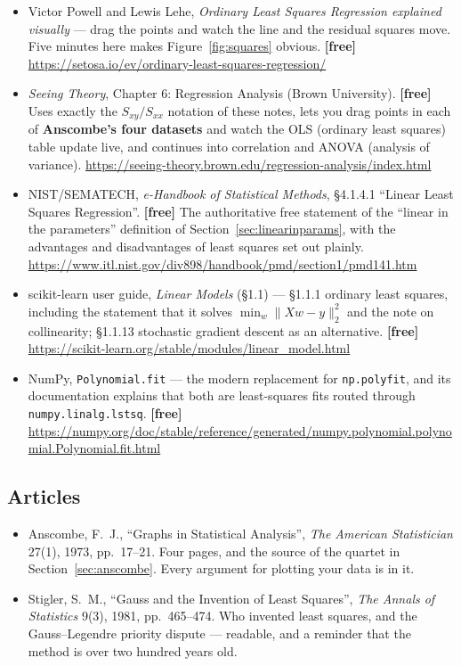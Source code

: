 \documentclass[11pt]{article}
\begin{document}
\begin{itemize}[leftmargin=*]
  \item Victor Powell and Lewis Lehe, \emph{Ordinary Least Squares Regression
    explained visually} --- drag the points and watch the line and the
    residual squares move. Five minutes here makes Figure~\ref{fig:squares}
    obvious. \textbf{[free]}
    \url{https://setosa.io/ev/ordinary-least-squares-regression/}
  \item \emph{Seeing Theory}, Chapter 6: Regression Analysis (Brown
    University). \textbf{[free]} Uses exactly the $S_{xy}/S_{xx}$ notation of
    these notes, lets you drag points in each of \textbf{Anscombe's four
    datasets} and watch the OLS (ordinary least squares) table update live, and continues into
    correlation and ANOVA (analysis of variance).
    \url{https://seeing-theory.brown.edu/regression-analysis/index.html}
  \item NIST/SEMATECH, \emph{e-Handbook of Statistical Methods}, \S4.1.4.1
    ``Linear Least Squares Regression''. \textbf{[free]} The authoritative
    free statement of the ``linear in the parameters'' definition of
    Section~\ref{sec:linearinparams}, with the advantages and disadvantages of
    least squares set out plainly.
    \url{https://www.itl.nist.gov/div898/handbook/pmd/section1/pmd141.htm}
  \item scikit-learn user guide, \emph{Linear Models} (\S1.1) ---
    \S1.1.1 ordinary least squares, including the statement that it solves
    $\min_w \lVert Xw-y\rVert_2^2$ and the note on collinearity;
    \S1.1.13 stochastic gradient descent as an alternative. \textbf{[free]}
    \url{https://scikit-learn.org/stable/modules/linear_model.html}
  \item NumPy, \texttt{Polynomial.fit} --- the modern replacement for
    \texttt{np.polyfit}, and its documentation explains that both are
    least-squares fits routed through \texttt{numpy.linalg.lstsq}.
    \textbf{[free]}
    \url{https://numpy.org/doc/stable/reference/generated/numpy.polynomial.polynomial.Polynomial.fit.html}
\end{itemize}

\subsection*{Articles}

\begin{itemize}[leftmargin=*]
  \item Anscombe, F.~J., ``Graphs in Statistical Analysis'', \emph{The
    American Statistician} 27(1), 1973, pp.~17--21. Four pages, and the source
    of the quartet in Section~\ref{sec:anscombe}. Every argument for plotting
    your data is in it.
  \item Stigler, S.~M., ``Gauss and the Invention of Least Squares'',
    \emph{The Annals of Statistics} 9(3), 1981, pp.~465--474. Who invented
    least squares, and the Gauss--Legendre priority dispute --- readable, and
    a reminder that the method is over two hundred years old.
\end{itemize}

\enlargethispage{4\baselineskip}
\notesources{\AMLUnitVSources}
\end{document}
